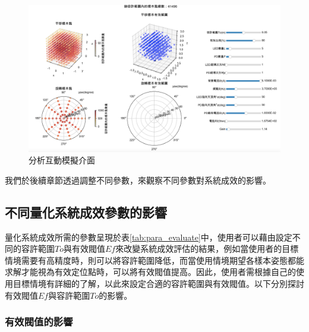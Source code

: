 \begin{figure}[htpb]
    \centering
    \includegraphics[width=15cm]{ch4pic/analysis_interactive.png}
    \caption{分析互動模擬介面}
    \label{pic:analysis_interactive}
\end{figure}

我們於後續章節透過調整不同參數，來觀察不同參數對系統成效的影響。






\subsection{不同量化系統成效參數的影響}
\label{chp:effect_evaluate_para}

量化系統成效所需的參數呈現於表\ref{tab:para_evaluate}中，使用者可以藉由設定不同的容許範圍$To$與有效閥值$Ef$來改變系統成效評估的結果，例如當使用者的目標情境需要有高精度時，則可以將容許範圍降低，而當使用情境期望各樣本姿態都能求解才能視為有效定位點時，可以將有效閥值提高。因此，使用者需根據自己的使用目標情境有詳細的了解，以此來設定合適的容許範圍與有效閥值。以下分別探討有效閥值$Ef$與容許範圍$To$的影響。

\subsubsection{有效閥值的影響}
\label{chp:effect_ef}



